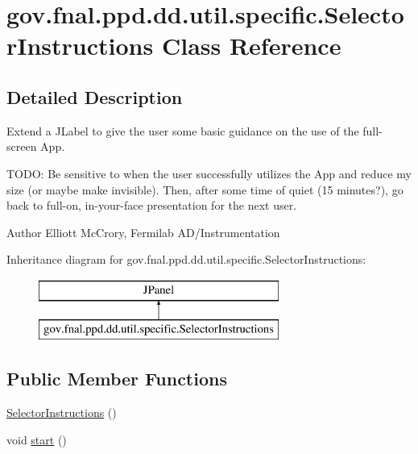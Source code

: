 \hypertarget{classgov_1_1fnal_1_1ppd_1_1dd_1_1util_1_1specific_1_1SelectorInstructions}{\section{gov.\-fnal.\-ppd.\-dd.\-util.\-specific.\-Selector\-Instructions Class Reference}
\label{classgov_1_1fnal_1_1ppd_1_1dd_1_1util_1_1specific_1_1SelectorInstructions}
}


\subsection{Detailed Description}
Extend a J\-Label to give the user some basic guidance on the use of the full-\/screen App.

T\-O\-D\-O\-: Be sensitive to when the user successfully utilizes the App and reduce my size (or maybe make invisible). Then, after some time of quiet (15 minutes?), go back to full-\/on, in-\/your-\/face presentation for the next user.

\begin{DoxyAuthor}{Author}
Elliott Mc\-Crory, Fermilab A\-D/\-Instrumentation 
\end{DoxyAuthor}
Inheritance diagram for gov.\-fnal.\-ppd.\-dd.\-util.\-specific.\-Selector\-Instructions\-:\begin{figure}[H]
\begin{center}
\leavevmode
\includegraphics[height=2.000000cm]{classgov_1_1fnal_1_1ppd_1_1dd_1_1util_1_1specific_1_1SelectorInstructions}
\end{center}
\end{figure}
\subsection*{Public Member Functions}
\begin{DoxyCompactItemize}
\item 
\hyperlink{classgov_1_1fnal_1_1ppd_1_1dd_1_1util_1_1specific_1_1SelectorInstructions_a47e9f61f9d6edf54d0ac63288fe53a2b}{Selector\-Instructions} ()
\item 
void \hyperlink{classgov_1_1fnal_1_1ppd_1_1dd_1_1util_1_1specific_1_1SelectorInstructions_acc5173794b299a9e4f9062cead781bad}{start} ()
\end{DoxyCompactItemize}

